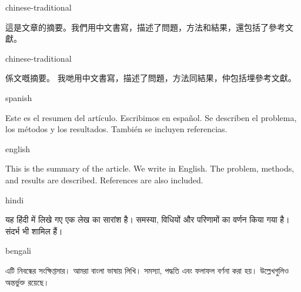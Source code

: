 \documentclass[colorlinks,nofoot,spanish,japanese,russian,greek,ukrainian,vietnamese,french,portuguese,turkish,polish,indonesian,italian,german,latin,serbianc,bidi=basic]{asmeconf}
\begin{document}
\begin{selectlanguage}{chinese-traditional}%
\begin{abstract*}
這是文章的摘要。我們用中文書寫，描述了問題，方法和結果，還包括了參考文獻。
\end{abstract*}
\end{selectlanguage}%

\begin{selectlanguage}{chinese-traditional}%
\begin{abstract*}
係文嘅摘要。 我哋用中文書寫，描述了問題，方法同結果，仲包括埋參考文獻。
\end{abstract*}
\end{selectlanguage}%

{\NotoSerif
\begin{selectlanguage}{spanish}
\begin{abstract*}
Este es el resumen del artículo. Escribimos en español. Se describen el problema, los métodos y los resultados. También se incluyen referencias.
\end{abstract*}
\end{selectlanguage}%

\begin{selectlanguage}{english}
\begin{abstract*}
This is the summary of the article. We write in English. The problem, methods, and results are described. References are also included.
\end{abstract*}
\end{selectlanguage}%
}%

\begin{selectlanguage}{hindi}
\begin{abstract*}
यह हिंदी में लिखे गए एक लेख का सारांश है। समस्या, विधियों और परिणामों का वर्णन किया गया है। संदर्भ भी शामिल हैं।
\end{abstract*}
\end{selectlanguage}%

\begin{selectlanguage}{bengali}
\begin{abstract*}
এটি নিবন্ধের সংক্ষিপ্তসার। আমরা বাংলা ভাষায় লিখি। সমস্যা, পদ্ধতি এবং ফলাফল বর্ণনা করা হয়। উল্লেখগুলিও অন্তর্ভুক্ত রয়েছে।
\end{abstract*}
\end{selectlanguage}%
\end{document}
